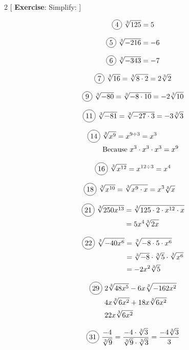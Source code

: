 \begin{multicols}{2}
[
  \textbf{Exercise}: Simplify:
]

\begin{align*}
  \circled{4}\ \sqrt[3]{125}=5
\end{align*}

  \[\circled{5}\ \sqrt[3]{-216}=-6\]

  \[\circled{6}\ \sqrt[3]{-343}=-7\]

  \[\circled{7}\ \sqrt[3]{16}=\sqrt[3]{8\cdot 2}=2\sqrt[3]{2}\]

  \[\circled{9}\ \sqrt[3]{-80}=\sqrt[3]{-8\cdot 10}=-2\sqrt[3]{10}\]

  \[\circled{11}\ \sqrt[3]{-81}=\sqrt[3]{-27\cdot 3}=-3\sqrt[3]{3}\]

  \begin{align*}
    \circled{14}\ &\sqrt[3]{x^{9}}=x^{9\div 3}=x^{3}\\
    &\text{Because }x^{3}\cdot x^{3}\cdot x^{3}=x^{9}
  \end{align*}

  \[\circled{16}\ \sqrt[3]{x^{12}}=x^{12\div 3}=x^{4}\]

  \begin{align*}
    \circled{18}\ \sqrt[3]{x^{10}}&=\sqrt[3]{x^{9}\cdot x}=x^{3}\sqrt[3]{x}
  \end{align*}

  \begin{align*}
    \circled{21}\ \sqrt[3]{250x^{13}}&=\sqrt[3]{125\cdot 2\cdot x^{12}\cdot x}\\
    &=5x^{4}\sqrt[3]{2x}
  \end{align*}

  \begin{align*}
    \circled{22}\ \sqrt[3]{-40x^{6}}&=\sqrt[3]{-8\cdot 5 \cdot x^{6}}\\
    &=\sqrt[3]{-8}\cdot \sqrt[3]{5}\cdot \sqrt[3]{x^{6}}\\
    &=-2x^{2}\sqrt[3]{5}
  \end{align*}

  \begin{align*}
    \circled{29}\ &2\sqrt[3]{48x^{5}}-6x\sqrt[3]{-162x^{2}}\\
    &4x\sqrt[3]{6x^{2}}+18x\sqrt[3]{6x^{2}}\\
    &22x\sqrt[3]{6x^{2}}
  \end{align*}

  \begin{align*}
    \circled{31}\ \frac{-4}{\sqrt[3]{9}}=\frac{-4\cdot \sqrt[3]{3}}{\sqrt[3]{9}\cdot \sqrt[3]{3}}=\frac{-4\sqrt[3]{3}}{3}\\
  \end{align*}


\end{multicols}
